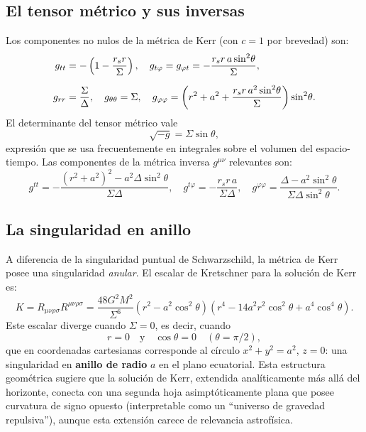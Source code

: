 \subsection{El tensor métrico y sus inversas}

Los componentes no nulos de la métrica de Kerr (con $c = 1$ por brevedad) son:
\begin{align}
  g_{tt}       &= -\left(1 - \frac{r_s r}{\Sigma}\right), \quad
  g_{t\varphi}  = g_{\varphi t} = -\frac{r_s r\,a\sin^2\!\theta}{\Sigma}, \nl
  g_{rr}        &= \frac{\Sigma}{\Delta}, \quad
  g_{\theta\theta} = \Sigma, \quad
  g_{\varphi\varphi} = \left(r^2 + a^2 + \frac{r_s r\,a^2\sin^2\!\theta}{\Sigma}\right)\sin^2\!\theta.
\end{align}
El determinante del tensor métrico vale
\begin{equation}
  \sqrt{-g} = \Sigma\sin\theta,
  \label{eq:det_kerr}
\end{equation}
expresión que se usa frecuentemente en integrales sobre el volumen del espacio-tiempo. Las componentes de la métrica inversa $g^{\mu\nu}$ relevantes son:
\begin{equation}
  g^{tt} = -\frac{(r^2+a^2)^2 - a^2\Delta\sin^2\!\theta}{\Sigma\Delta},
  \quad
  g^{t\varphi} = -\frac{r_s r\,a}{\Sigma\Delta}, \quad
  g^{\varphi\varphi} = \frac{\Delta - a^2\sin^2\!\theta}{\Sigma\Delta\sin^2\!\theta}.
\end{equation}

\subsection{La singularidad en anillo}

A diferencia de la singularidad puntual de Schwarzschild, la métrica de Kerr posee una singularidad \emph{anular}. El escalar de Kretschner para la solución de Kerr es:
\begin{equation}
  K = R_{\mu\nu\rho\sigma}R^{\mu\nu\rho\sigma}
    = \frac{48 G^2 M^2}{\Sigma^6}\!\left(r^2 - a^2\cos^2\!\theta\right)\!\left(r^4 - 14a^2r^2\cos^2\!\theta + a^4\cos^4\!\theta\right).
  \label{eq:kretschner_kerr}
\end{equation}
Este escalar diverge cuando $\Sigma = 0$, es decir, cuando
\begin{equation}
  r = 0 \quad \text{y} \quad \cos\theta = 0 \quad (\theta = \pi/2),
  \label{eq:singularidad_anillo}
\end{equation}
que en coordenadas cartesianas corresponde al círculo $x^2 + y^2 = a^2$, $z = 0$: una singularidad en \textbf{anillo de radio} $a$ en el plano ecuatorial. Esta estructura geométrica sugiere que la solución de Kerr, extendida analíticamente más allá del horizonte, conecta con una segunda hoja asimptóticamente plana que posee curvatura de signo opuesto (interpretable como un ``universo de gravedad repulsiva''), aunque esta extensión carece de relevancia astrofísica.

